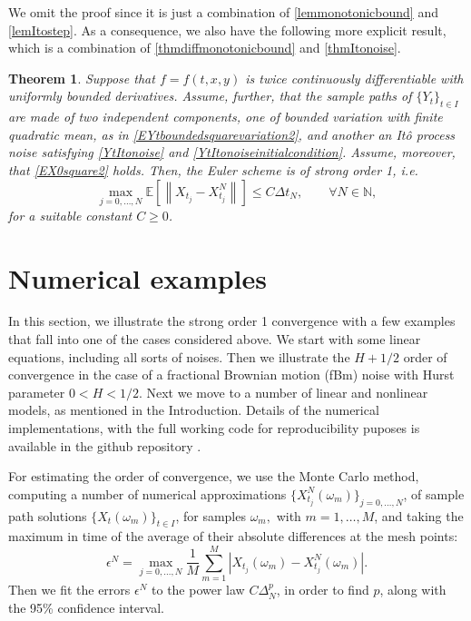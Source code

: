 \documentclass[reqno,12pt]{amsart}
\theoremstyle{plain} %
\newtheorem{theorem}{Theorem}[section]
\theoremstyle{definition} %
\begin{document}
We omit the proof since it is just a combination of \cref{lemmonotonicbound} and \cref{lemItostep}. As a consequence, we also have the following more explicit result, which is a combination of \cref{thmdiffmonotonicbound} and \cref{thmItonoise}.

\begin{theorem}
    \label{thmmixedcasepractical}
    Suppose that $f=f(t, x, y)$ is twice continuously differentiable with uniformly bounded derivatives. Assume, further, that the sample paths of $\{Y_t\}_{t\in I}$ are made of two independent components, one of bounded variation with finite quadratic mean, as in \eqref{EYtboundedsquarevariation2}, and another an It\^o process noise satisfying \eqref{YtItonoise} and \eqref{YtItonoiseinitialcondition}. Assume, moreover, that \eqref{EX0square2} holds. Then, the Euler scheme is of strong order 1, i.e.
    \begin{equation}
        \max_{j=0, \ldots, N}\mathbb{E}\left[ \left\| X_{t_j} - X_{t_j}^N \right\| \right] \leq C \Delta t_N, \qquad \forall N \in \mathbb{N},
    \end{equation}
    for a suitable constant $C \geq 0$.
\end{theorem}

\section{Numerical examples}
\label{secnumericalexamples}

In this section, we illustrate the strong order 1 convergence with a few examples that fall into one of the cases considered above. We start with some linear equations, including all sorts of noises. Then we illustrate the $H + 1/2$ order of convergence in the case of a fractional Brownian motion (fBm) noise with Hurst parameter $0 < H < 1/2$. Next we move to a number of linear and nonlinear models, as mentioned in the Introduction. Details of the numerical implementations, with the full working code for reproducibility puposes is available in the github repository \cite{RODEConvEM2023}.

For estimating the order of convergence, we use the Monte Carlo method, computing a number of numerical approximations $\{X_{t_j}^N(\omega_m)\}_{j=0, \ldots, N}$, of sample path solutions $\{X_t(\omega_m)\}_{t\in I}$, for samples $\omega_m,$ with $m = 1, \ldots, M$, and taking the maximum in time of the average of their absolute differences at the mesh points:
\begin{equation}
    \epsilon^N = \max_{j=0, \ldots, N} \frac{1}{M}\sum_{m=1}^M \left|X_{t_j}(\omega_m) - X_{t_j}^N(\omega_m)\right|.
\end{equation}
Then we fit the errors $\epsilon^N$ to the power law $C\Delta_N^p$, in order to find $p$, along with the 95\% confidence interval.
\end{document}
